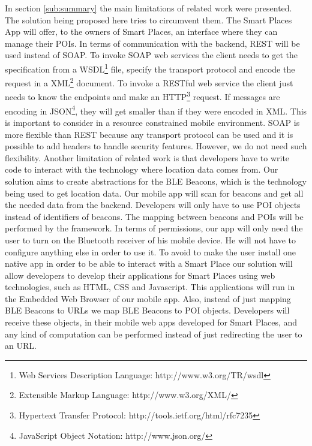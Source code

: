 In section \ref{sub:summary} the main limitations 
of related work were presented.
The solution being proposed here tries to
circumvent them. The Smart Places App will
offer, to the owners of Smart Places, an interface
where they can manage their POIs.
In terms of communication with the backend,
REST\cite{richardson2008restful} will be used instead
of SOAP. To invoke SOAP web services the client needs
to get the specification from a 
WSDL\footnote{Web Services Description Language:
http://www.w3.org/TR/wsdl} file, specify the
transport protocol and encode the request in a
XML\footnote{Extensible Markup Language:
http://www.w3.org/XML/} document. To invoke a
RESTful web service the client just needs to know
the endpoints and make an 
HTTP\footnote{Hypertext Transfer Protocol:
http://tools.ietf.org/html/rfc7235} request.
If messages are encoding in 
JSON\footnote{JavaScript Object Notation:
http://www.json.org/}, they will
get smaller than if they were encoded in XML.
This is important to consider in a resource constrained
mobile environment. SOAP is more flexible than REST
because any transport protocol can be used and it is
possible to add headers to handle security features.
However, we do not need such flexibility.
Another limitation of related work is that developers
have to write code to interact with the technology
where location data comes from. Our solution aims to
create abstractions for the BLE Beacons, which is the
technology being used to get location data.
Our mobile app will scan for beacons and get all the
needed data from the backend. Developers will only have
to use POI objects instead of identifiers of beacons.
The mapping between beacons and POIs will be performed
by the framework.
In terms of permissions, our app will only need the
user to turn on the Bluetooth receiver of his
mobile device. He will not have to configure
anything else in order to use it.
To avoid to make the user install one native app
in order to be able to interact with a Smart Place
our solution will allow developers to develop their
applications for Smart Places using web technologies,
such as HTML, CSS and Javascript. This applications
will run in the Embedded Web Browser of our mobile app.
Also, instead of just mapping BLE Beacons to URLs we map
BLE Beacons to POI objects. Developers will receive
these objects, in their mobile web apps developed for
Smart Places, and any kind of computation can be 
performed instead of just redirecting the user to an
URL.
